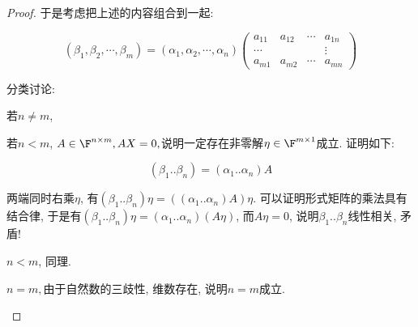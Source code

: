 \begin{proof}
于是考虑把上述的内容组合到一起:

\[
(\beta_{1},\beta_{2},\cdots,\beta_{m})=(\alpha_{1},\alpha_{2},\cdots,\alpha_{n})\begin{pmatrix}a_{11} & a_{12} & \cdots & a_{1n}\\
\cdots &  &  & \vdots\\
a_{m1} & a_{m2} & \cdots & a_{mn}
\end{pmatrix}
\]

分类讨论:
\begin{casenv}
\item 若$n\neq m$, 
\begin{casenv}
\item 若$n<m$, $A\in\F^{n\times m},AX=0,$说明一定存在非零解$\eta\in\F^{m\times1}$成立.
证明如下: 

\[
\left(\beta_{1}..\beta_{n}\right)=\left(\alpha_{1}..\alpha_{n}\right)A
\]

两端同时右乘$\eta$, 有$\left(\beta_{1}..\beta_{n}\right)\eta=\left(\left(\alpha_{1}..\alpha_{n}\right)A\right)\eta$.
可以证明形式矩阵的乘法具有结合律, 于是有$\left(\beta_{1}..\beta_{n}\right)\eta=\left(\alpha_{1}..\alpha_{n}\right)\left(A\eta\right)$,
而$A\eta=0$, 说明$\beta_{1}..\beta_{n}$线性相关, 矛盾!
\item $n<m$, 同理. 
\end{casenv}
\item $n=m,$由于自然数的三歧性, 维数存在, 说明$n=m$成立. 
\end{casenv}
\end{proof}
%
